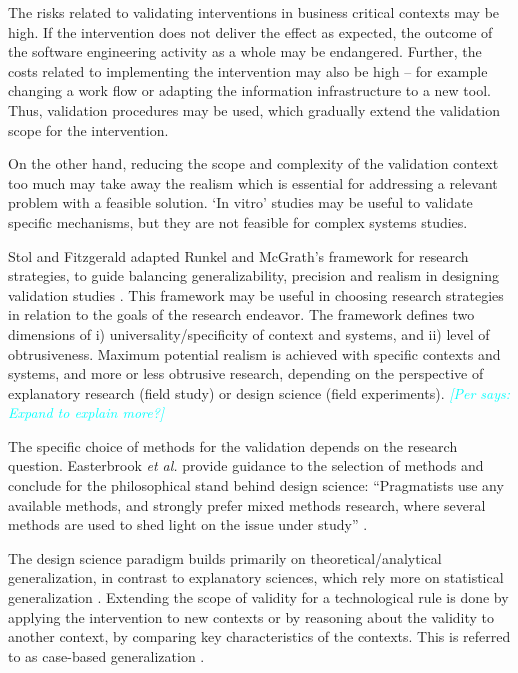 \documentclass[graybox]{svmult}
\newcommand{\per}[1]{\textcolor{cyan}{{\it [Per says: #1]}}}
\newcommand{\per}[1]{}
\begin{document}
The risks related to validating interventions in business critical contexts may be high. If the intervention does not deliver the effect as expected, the outcome of the software engineering activity as a whole may be endangered. Further, the costs related to implementing the intervention may also be high -- for example changing a work flow or adapting the information infrastructure to a new tool. Thus, validation procedures may be used, which gradually extend the validation scope for the intervention.

On the other hand, reducing the scope and complexity of the validation context too much may take away the realism which is essential for addressing a relevant problem with a feasible solution. `In vitro' studies may be useful to validate specific mechanisms, but they are not feasible for complex systems studies.  

Stol and Fitzgerald adapted Runkel and McGrath's framework for research strategies, to guide balancing generalizability, precision and realism in designing validation studies \cite{StolABC18}. This framework may be useful in choosing research strategies in relation to the goals of the research endeavor. The framework defines two dimensions of i) universality/specificity of context and systems, and ii) level of obtrusiveness. Maximum potential realism is achieved with specific contexts and systems, and more or less obtrusive research, depending on the perspective of explanatory research (field study) or design science (field experiments). \per{Expand to explain more?} 

The specific choice of methods for the validation depends on the research question. Easterbrook \emph{et al.} provide guidance to the selection of methods and conclude for the philosophical stand behind design science: ``Pragmatists use any available methods, and strongly prefer mixed methods research, where several methods are used to shed light on the issue under study'' \cite{easterbrook_selecting_2008}.

The design science paradigm builds primarily on theoretical/analytical generalization, in contrast to explanatory sciences, which rely more on statistical generalization \cite[p. 30]{Runeson12Case}. Extending the scope of validity for a technological rule is done by applying the intervention to new contexts or by reasoning about the validity to another context, by comparing key characteristics of the contexts. This is referred to as case-based generalization \cite{Wieringa2015}. 
\end{document}
